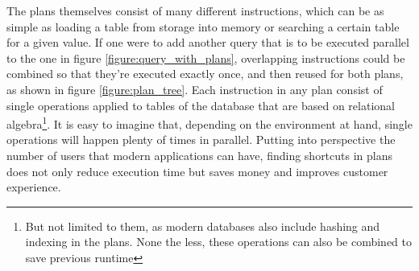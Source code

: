 The plans themselves consist of many different instructions, which can be as simple as loading a table from storage into memory or searching a certain table for a given value. If one were to add another query that is to be executed parallel to the one in figure \ref{figure:query_with_plans}, overlapping instructions could be combined so that they're executed exactly once, and then reused for both plans, as shown in figure \ref{figure:plan_tree}. Each instruction in any plan consist of single operations applied to tables of the database that are based on relational algebra\cite{codd_relational_1970}\footnote{But not limited to them, as modern databases also include hashing and indexing in the plans. None the less, these operations can also be combined to save previous runtime}. It is easy to imagine that, depending on the environment at hand, single operations will happen plenty of times in parallel. Putting into perspective the number of users that modern applications\cite{uber_technologies_inc_uber_2022} can have, finding shortcuts in plans does not only reduce execution time but saves money and improves customer experience.

